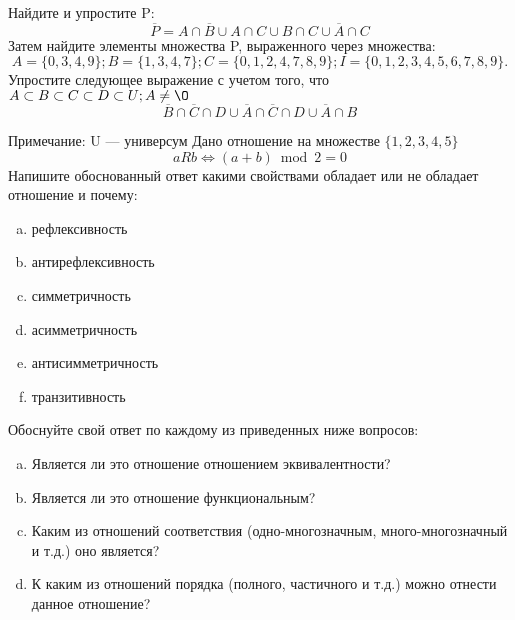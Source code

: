 \documentclass[10pt]{exam}
\begin{document}
\begin{questions}
\question
Найдите и упростите P:
\begin{equation*}
\overline{P} = A \cap \overline{B} \cup A \cap C \cup B \cap C \cup \overline{A} \cap C
\end{equation*}
Затем найдите элементы множества P, выраженного через множества:
\begin{equation*}
A = \{0, 3, 4, 9\}; 
B = \{1, 3, 4, 7\};
C = \{0, 1, 2, 4, 7, 8, 9\};
I = \{0, 1, 2, 3, 4, 5, 6, 7, 8, 9\}.
\end{equation*}\question
Упростите следующее выражение с учетом того, что $A\subset B \subset C \subset D \subset U; A \neq \O$
\begin{equation*}
\overline{B} \cap \overline{C} \cap D \cup \overline{A} \cap \overline{C} \cap D \cup \overline{A} \cap B
\end{equation*}

Примечание: U — универсум\question
Дано отношение на множестве $\{1, 2, 3, 4, 5\}$ 
\begin{equation*}
aRb \iff (a+b) \bmod 2 =0
\end{equation*}
Напишите обоснованный ответ какими свойствами обладает или не обладает отношение и почему:   
\begin{enumerate} [a)]\setcounter{enumi}{0}
\item рефлексивность
\item антирефлексивность
\item симметричность
\item асимметричность
\item антисимметричность
\item транзитивность
\end{enumerate}

Обоснуйте свой ответ по каждому из приведенных ниже вопросов:
\begin{enumerate} [a)]\setcounter{enumi}{0}
    \item Является ли это отношение отношением эквивалентности?
    \item Является ли это отношение функциональным?
    \item Каким из отношений соответствия (одно-многозначным, много-многозначный и т.д.) оно является?
    \item К каким из отношений порядка (полного, частичного и т.д.) можно отнести данное отношение?
\end{enumerate}




\end{questions}
\end{document}
